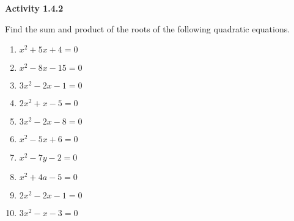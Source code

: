 \noindent\textbf{Activity 1.4.2}

\vspace{0.75ex}

Find the sum and product of the roots of the following quadratic equations.

\begin{multicols}{2}
\begin{enumerate}[label = \color{blue}\arabic*. ]
   \item $ x^2 + 5x + 4 = 0 $
   \item $ x^2 - 8x - 15 = 0 $
   \item $ 3x^2 - 2x - 1 = 0 $
   \item $ 2x^2 + x - 5 = 0 $
   \item $ 3x^2 - 2x - 8 = 0 $
   \item $ x^2 - 5x + 6 = 0 $
   \item $ x^2 - 7y - 2 = 0 $
   \item $ x^2 + 4a - 5 = 0 $
   \item $ 2x^2 - 2x - 1 = 0 $
   \item $ 3x^2 - x - 3 = 0 $
\end{enumerate}
\end{multicols} 



